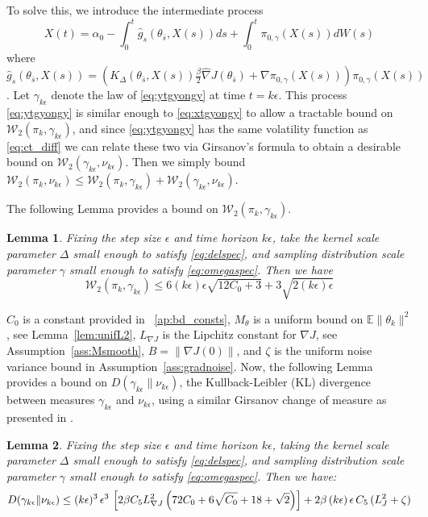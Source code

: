 \documentclass[journal,onecolumn]{IEEEtran}
\newtheorem{lemma}{Lemma}
\newcommand{\alk}{\alpha_k}
\newcommand{\thk}{\theta_k}
\newcommand{\step}{\epsilon}
\newcommand{\grad}{\nabla}
\newcommand{\gradn}{\hat{\nabla}}
\newcommand{\rew}{J}
\newcommand{\CE}{\mathbb{E}}
\newcommand{\browns}{W(s)}
\newcommand{\sbar}{\bar{s}}
\newcommand{\wass}{\mathcal{W}_2}
\newcommand{\KL}{D}
\newcommand{\K}{K}
\newcommand{\Kd}{\K_{\Delta}}
\newcommand{\xt}{X(t)}
\newcommand{\dtlaw}{\ids_{k}} %
\newcommand{\ctlaw}{\nu_{k\step}}
\newcommand{\ctlawp}{\ctlaw'}
\newcommand{\etsup}{M_{\theta}}
\newcommand{\ids}{\pi}
\newcommand{\idw}{\gamma}
\newcommand{\isp}{0,\idw}
\newcommand{\ksp}{k,\idw}
\newcommand{\gradnvar}{\zeta}
\newcommand{\idistrw}{\ids_{\isp}}
\newcommand{\ytlaw}{\gamma_{k\step}}
\newcommand{\lipJ}{L_J}
\newcommand{\lipGJ}{L_{\grad\rew}}
\begin{document}
{To solve this, we introduce the intermediate process
\begin{equation}
\label{eq:ytgyongy}
\xt = \alpha_0 - \int_0^t \hat{g}_s(\theta_{\sbar},X(s))ds + \int_0^t \idistrw(X(s))d\browns
\end{equation}
where 
$\hat{g}_s(\theta_{\sbar},X(s)) = \left(\Kd(\theta_{\sbar},X(s))\frac{\beta}{2}\gradn \rew(\theta_{\sbar}) + \grad\idistrw(X(s))\right)\idistrw(X(s))$. 
Let $\ytlaw$ denote the law of \eqref{eq:ytgyongy} at time $t=k \step$. 
This process \eqref{eq:ytgyongy} is similar enough to \eqref{eq:xtgyongy} to allow a tractable bound on $\wass(\dtlaw,\ytlaw)$, and since \eqref{eq:ytgyongy} has the same volatility function as \eqref{eq:ct_diff} we can relate these two via Girsanov's formula to obtain a desirable bound on $\wass(\ytlaw,\ctlaw)$. Then we simply bound $\wass(\dtlaw,\ctlaw) \leq \wass(\dtlaw,\ytlaw) + \wass(\ytlaw,\ctlaw)$.


The following Lemma provides a bound on $\wass(\dtlaw,\ytlaw)$.
\begin{lemma}
\label{lem:MSEbd}
    Fixing the step size $\step$ and time horizon $k \step$, take the kernel scale parameter $\Delta$ small enough to satisfy \eqref{eq:delspec}, and sampling distribution scale parameter $\idw$ small enough to satisfy \eqref{eq:omegaspec}. Then we have 
    \[\wass(\dtlaw,\ytlaw) \leq 6(k\step)\step\sqrt{12C_0 + 3} + 3\sqrt{2(k\step)\step}\]
\end{lemma}
\color{black}{Here} $C_0$ is a constant provided in \color{black}{Appendix}~\ref{ap:bd_consts}, 
$\etsup$ is a uniform bound on $\CE\|\thk\|^2$, see Lemma~\ref{lem:unifL2}, $\lipGJ$ is the Lipchitz constant for $\grad\rew$, see Assumption~\ref{ass:Msmooth}, $B =\|\grad\rew(0)\|$,  and $\gradnvar$ is the uniform noise variance bound in Assumption~\ref{ass:gradnoise}.
Now, the following Lemma provides a bound on $\KL(\ytlaw\| \ctlaw)$, the Kullback-Leibler (KL) divergence between measures $\ytlaw$ and $\ctlaw$, using a similar Girsanov change of measure as presented in \cite{raginsky2017non}.
\begin{lemma}
\label{lem:KL_bd}
Fixing the step size $\step$ and time horizon $k \step$, taking  the kernel scale parameter $\Delta$ small enough to satisfy \eqref{eq:delspec}, and sampling distribution scale parameter $\idw$ small enough to satisfy \eqref{eq:omegaspec}. Then we have:
\[\KL(\ytlaw \| \ctlaw) \leq {\color{black}(k\step)^3\,\step^3\,\left[2\beta C_5 \lipGJ^2\left(72C_0 + 6\sqrt{C_0} + 18+\sqrt{2} \right) \right] + 2\beta\,(k\step)\,\step \,C_5\,(\lipJ^2 + \gradnvar)}\]
\end{lemma}

}
\end{document}

